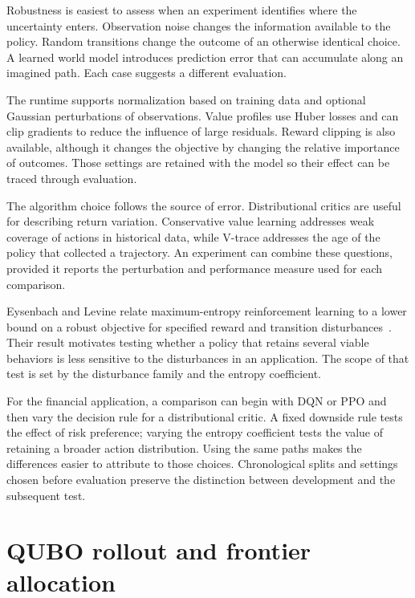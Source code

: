 \documentclass{strategynet-journal}
\begin{document}
\begin{SNcolumns}

Robustness is easiest to assess when an experiment identifies where the
uncertainty enters. Observation noise changes the information available to
the policy. Random transitions change the outcome of an otherwise identical
choice. A learned world model introduces prediction error that can accumulate
along an imagined path. Each case suggests a different evaluation.

The runtime supports normalization based on training data and optional
Gaussian perturbations of observations. Value profiles use Huber losses and
can clip gradients to reduce the influence of large residuals. Reward clipping
is also available, although it changes the objective by changing the relative
importance of outcomes. Those settings are retained with the model so their
effect can be traced through evaluation.

The algorithm choice follows the source of error. Distributional critics are
useful for describing return variation. Conservative value learning addresses
weak coverage of actions in historical data, while V-trace addresses the age
of the policy that collected a trajectory. An experiment can combine these
questions, provided it reports the perturbation and performance measure used
for each comparison.

Eysenbach and Levine relate maximum-entropy reinforcement learning to a lower
bound on a robust objective for specified reward and transition disturbances~\cite{maxentrobust}.
Their result motivates testing whether a policy that retains several viable
behaviors is less sensitive to the disturbances in an application. The scope
of that test is set by the disturbance family and the entropy coefficient.

For the financial application, a comparison can begin with DQN or PPO and
then vary the decision rule for a distributional critic. A fixed downside
rule tests the effect of risk preference; varying the entropy coefficient
tests the value of retaining a broader action distribution. Using the same
paths makes the differences easier to attribute to those choices. Chronological
splits and settings chosen before evaluation preserve the distinction between
development and the subsequent test.

\end{SNcolumns}

\section{QUBO rollout and frontier allocation}
\label{sec:qubo}
\end{document}
